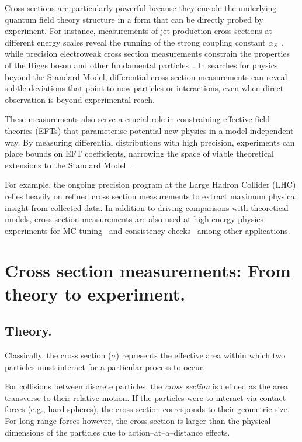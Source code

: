 \begin{definition}
Cross sections are particularly powerful because they encode the underlying quantum field theory structure in a form that can be directly probed by experiment.
%
For instance, measurements of jet production cross sections at different energy scales reveal the running of the strong coupling constant \(\alpha_S\)~\cite{chiefa_parton_2025}, while precision electroweak cross section measurements constrain the properties of the Higgs boson and other fundamental particles~\cite{noauthor_precision_2006}.
%
In searches for physics beyond the Standard Model, differential cross section measurements can reveal subtle deviations that point to new particles or interactions, even when direct observation is beyond experimental reach.

These measurements also serve a crucial role in constraining effective field theories (EFTs) that parameterise potential new physics in a model independent way.
%
By measuring differential distributions with high precision, experiments can place bounds on EFT coefficients, narrowing the space of viable theoretical extensions to the Standard Model~\cite{contino_validity_2016}.

For example, the ongoing precision program at the Large Hadron Collider (LHC) relies heavily on refined cross section measurements to extract maximum physical insight from collected data.
%
In addition to driving comparisons with theoretical models, cross section measurements are also used at high energy physics experiments for MC tuning~\cite{albert_antares_2025} and consistency checks~\cite{buckley_constraints_2025} among other applications.

\section{Cross section measurements: From theory to experiment.}
\subsection{Theory.}
    Classically, the cross section (\(\sigma\)) represents the effective area within which two particles must interact for a particular process to occur.
    \begin{definition}
        For collisions between discrete particles, the \emph{cross section} is defined as the area transverse to their relative motion.
        If the particles were to interact via contact forces (e.g., hard spheres), the cross section corresponds to their geometric size.
        For long range forces however, the cross section is larger than the physical dimensions of the particles due to action--at--a--distance effects.
    \end{definition}
%


\end{definition}
